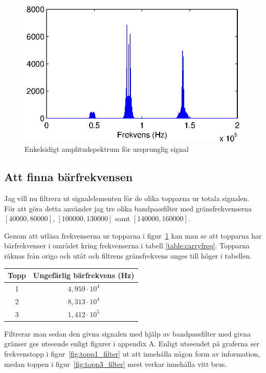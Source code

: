 \documentclass[10pt,twocolumn]{article}
\begin{document}
\begin{figure}[htp]
  \begin{center}
  \includegraphics[keepaspectratio=true,width=\linewidth]{fft_orig_data_oneside.eps}  %
  \end{center}
  \caption{Enkelsidigt amplitudspektrum för ursprunglig signal} %
  \label{fig:fft_orig_data}
\end{figure}

\subsection{Att finna bärfrekvensen}

Jag vill nu filtrera ut signalelementen för de olika topparna ur totala signalen. För att göra detta använder jag tre olika bandpassfilter med gränsfrekvenserna $[40000, 80000]$, $[100000, 130000]$ samt $[140000, 160000]$.

Genom att utläsa frekvenserna ur topparna i figur~\ref{fig:fft_orig_data} kan man se att topparna har bärfrekvenser i området kring frekvenserna i tabell \ref{table:carryfreq}. Topparna räknas från origo och utåt och filtrens gränsfrekvens anges till höger i tabellen. 
\begin{center}
\begin{tabular}{c | c }
	\hline
	Topp & Ungefärlig bärfrekvens (Hz) \\ \hline
	1 & $4,959 \cdot 10^4$ \\ \hline
	2 & $8,313 \cdot 10^4$ \\ \hline
	3 & $1,412 \cdot 10^5$ \\ \hline
\end{tabular}
\label{table:carryfreq}
\end{center}
Filtrerar man sedan den givna signalen med hjälp av bandpassfilter med givna gränser ges utseende enligt figurer i appendix A. Enligt utseendet på graferna ser frekvenstopp i figur~\ref{fig:topp1_filter} ut att innehålla någon form av information, medan toppen i figur~\ref{fig:topp3_filter} mest verkar innehålla vitt brus. 
\end{document}
